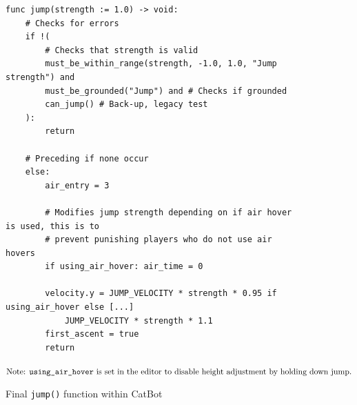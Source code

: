 \begin{figure}[H]
    \begin{fullwidth}
    \begin{tcolorbox}[boxrule=0.25mm]
    \begin{verbatim}
func jump(strength := 1.0) -> void:
    # Checks for errors
    if !(
        # Checks that strength is valid
        must_be_within_range(strength, -1.0, 1.0, "Jump strength") and
        must_be_grounded("Jump") and # Checks if grounded
        can_jump() # Back-up, legacy test
    ):
        return

    # Preceding if none occur
    else:
        air_entry = 3
        
        # Modifies jump strength depending on if air hover is used, this is to
        # prevent punishing players who do not use air hovers
        if using_air_hover: air_time = 0 

        velocity.y = JUMP_VELOCITY * strength * 0.95 if using_air_hover else [...]
            JUMP_VELOCITY * strength * 1.1
        first_ascent = true
        return
    \end{verbatim}
    $\text{Note: \texttt{using\_air\_hover} is set in the editor to disable height adjustment by holding down jump.}$
    \end{tcolorbox}
    \end{fullwidth}
    \caption{Final \texttt{jump()} function within CatBot}
    \label{fig:design/finalJump}
\end{figure}

